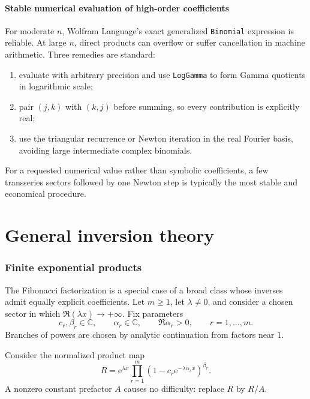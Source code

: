\documentclass[11pt,oneside]{article}
\numberwithin{equation}{section}
\theoremstyle{plain}
\theoremstyle{definition}
\theoremstyle{remark}
\newcommand{\e}{\mathrm e}
\newcommand{\C}{\mathbb C}
\begin{document}
\subsection{Stable numerical evaluation of high-order coefficients}

For moderate \(n\), Wolfram Language's exact generalized
\texttt{Binomial} expression is reliable.  At large \(n\), direct products
can overflow or suffer cancellation in machine arithmetic.  Three remedies
are standard:
\begin{enumerate}
\item evaluate with arbitrary precision and use \texttt{LogGamma} to form
      Gamma quotients in logarithmic scale;
\item pair \((j,k)\) with \((k,j)\) before summing, so every contribution is
      explicitly real;
\item use the triangular recurrence or Newton iteration in the real Fourier
      basis, avoiding large intermediate complex binomials.
\end{enumerate}
For a requested numerical value rather than symbolic coefficients, a few
transseries sectors followed by one Newton step is typically the most
stable and economical procedure.
\part{General inversion theory}

\section{Finite exponential products}\label{sec:general-products}

The Fibonacci factorization is a special case of a broad class whose
inverses admit equally explicit coefficients.  Let \(m\ge1\), let
\(\lambda\ne0\), and consider a chosen sector in which
\(\Re(\lambda x)\to+\infty\).  Fix parameters
\begin{equation}\label{eq:general-params}
 c_r,\beta_r\in\C,
 \qquad \alpha_r\in\C,
 \qquad \Re\alpha_r>0,
 \qquad r=1,\ldots,m.
\end{equation}
Branches of powers are chosen by analytic continuation from factors near
\(1\).

Consider the normalized product map
\begin{equation}\label{eq:general-product-map}
 R=\e^{\lambda x}
 \prod_{r=1}^m
 \left(1-c_r\e^{-\lambda\alpha_r x}\right)^{\beta_r}.
\end{equation}
A nonzero constant prefactor \(A\) causes no difficulty: replace \(R\) by
\(R/A\).
\end{document}
